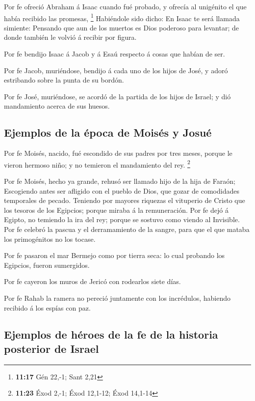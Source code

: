  Por fe ofreció Abraham á Isaac cuando fué probado, y
ofrecía al unigénito el que había recibido las promesas, \footnote{\textbf{11:17}
  Gén 22,-1; Sant 2,21}  Habiéndole sido dicho: En Isaac te
será llamada simiente:  Pensando que aun de los muertos es
Dios poderoso para levantar; de donde también le volvió á recibir por
figura.

 Por fe bendijo Isaac á Jacob y á Esaú respecto á cosas que
habían de ser.

 Por fe Jacob, muriéndose, bendijo á cada uno de los hijos
de José, y adoró estribando sobre la punta de su bordón.

 Por fe José, muriéndose, se acordó de la partida de los
hijos de Israel; y dió mandamiento acerca de sus huesos.

\hypertarget{ejemplos-de-la-uxe9poca-de-moisuxe9s-y-josuuxe9}{%
\subsection{Ejemplos de la época de Moisés y
Josué}\label{ejemplos-de-la-uxe9poca-de-moisuxe9s-y-josuuxe9}}

 Por fe Moisés, nacido, fué escondido de sus padres por
tres meses, porque le vieron hermoso niño; y no temieron el mandamiento
del rey. \footnote{\textbf{11:23} Éxod 2,-1; Éxod 12,1-12; Éxod 14,1-14}

 Por fe Moisés, hecho ya grande, rehusó ser llamado hijo de
la hija de Faraón;  Escogiendo antes ser afligido con el
pueblo de Dios, que gozar de comodidades temporales de pecado.
 Teniendo por mayores riquezas el vituperio de Cristo que
los tesoros de los Egipcios; porque miraba á la remuneración.
 Por fe dejó á Egipto, no temiendo la ira del rey; porque
se sostuvo como viendo al Invisible.  Por fe celebró la
pascua y el derramamiento de la sangre, para que el que mataba los
primogénitos no los tocase.

 Por fe pasaron el mar Bermejo como por tierra seca: lo
cual probando los Egipcios, fueron sumergidos.

 Por fe cayeron los muros de Jericó con rodearlos siete
días.

 Por fe Rahab la ramera no pereció juntamente con los
incrédulos, habiendo recibido á los espías con paz.

\hypertarget{ejemplos-de-huxe9roes-de-la-fe-de-la-historia-posterior-de-israel}{%
\subsection{Ejemplos de héroes de la fe de la historia posterior de
Israel}\label{ejemplos-de-huxe9roes-de-la-fe-de-la-historia-posterior-de-israel}}

